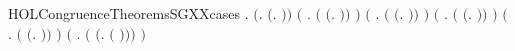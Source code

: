 \begin{SaveVerbatim}{HOLCongruenceTheoremsSGXXcases}
\HOLTokenTurnstile{} \HOLSymConst{\HOLTokenForall{}}.
         \HOLSymConst{\HOLTokenEquiv{}}
       \ensuremath{(}\HOLSymConst{\HOLTokenExists{}}.  \HOLSymConst{\ensuremath{=}} \ensuremath{(}\HOLTokenLambda{}. \ensuremath{)}\ensuremath{)} \HOLSymConst{\HOLTokenDisj{}}
       \ensuremath{(}\HOLSymConst{\HOLTokenExists{}} . \ensuremath{(} \HOLSymConst{\ensuremath{=}} \ensuremath{(}\HOLTokenLambda{}.  \HOLSymConst{\ensuremath{\ldotp}} \ensuremath{)}\ensuremath{)} \HOLSymConst{\HOLTokenConj{}}  \ensuremath{)} \HOLSymConst{\HOLTokenDisj{}}
       \ensuremath{(}\HOLSymConst{\HOLTokenExists{}} . \ensuremath{(} \HOLSymConst{\ensuremath{=}} \ensuremath{(}\HOLTokenLambda{}. \HOLSymConst{\ensuremath{\ldotp}} \ensuremath{)}\ensuremath{)} \HOLSymConst{\HOLTokenConj{}}  \ensuremath{)} \HOLSymConst{\HOLTokenDisj{}}
       \ensuremath{(}\HOLSymConst{\HOLTokenExists{}} . \ensuremath{(} \HOLSymConst{\ensuremath{=}} \ensuremath{(}\HOLTokenLambda{}.   \HOLSymConst{\ensuremath{+}}  \ensuremath{)}\ensuremath{)} \HOLSymConst{\HOLTokenConj{}}   \HOLSymConst{\HOLTokenConj{}}  \ensuremath{)} \HOLSymConst{\HOLTokenDisj{}}
       \ensuremath{(}\HOLSymConst{\HOLTokenExists{}} . \ensuremath{(} \HOLSymConst{\ensuremath{=}} \ensuremath{(}\HOLTokenLambda{}.   \HOLSymConst{\ensuremath{\mid}}  \ensuremath{)}\ensuremath{)} \HOLSymConst{\HOLTokenConj{}}   \HOLSymConst{\HOLTokenConj{}}  \ensuremath{)} \HOLSymConst{\HOLTokenDisj{}}
       \ensuremath{(}\HOLSymConst{\HOLTokenExists{}} . \ensuremath{(} \HOLSymConst{\ensuremath{=}} \ensuremath{(}\HOLTokenLambda{}.   \ensuremath{(} \ensuremath{)}\ensuremath{)}\ensuremath{)} \HOLSymConst{\HOLTokenConj{}}  \ensuremath{)} \HOLSymConst{\HOLTokenDisj{}}

\end{SaveVerbatim}
